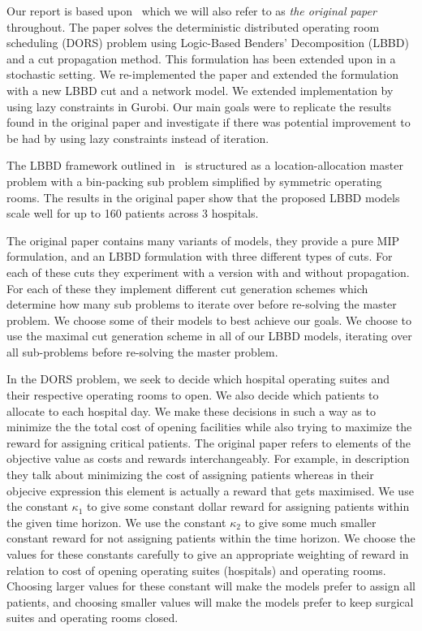 Our report is based upon~\cite{roshanaei2017propagating} which we will also refer to as \textit{the original paper} throughout. The paper solves the deterministic distributed  operating room scheduling (DORS) problem using Logic-Based Benders' Decomposition (LBBD) and a cut propagation method. This formulation has been extended upon in a stochastic setting\cite{guo}. We re-implemented the paper and extended the formulation with a new LBBD cut and a network model. We extended implementation by using lazy constraints in Gurobi. Our main goals were to replicate the results found in the original paper and investigate if there was potential improvement to be had by using lazy constraints instead of iteration.

The LBBD framework outlined in~\cite{roshanaei2017propagating} is structured as a location-allocation master problem with a bin-packing sub problem simplified by symmetric operating rooms. The results in the original paper show that the proposed LBBD models scale well for up to 160 patients across 3 hospitals.

The original paper contains many variants of models, they provide a pure MIP formulation, and an LBBD formulation with three different types of cuts. For each of these cuts they experiment with a version with and without propagation. For each of these they implement different cut generation schemes which determine how many sub problems to iterate over before re-solving the master problem. We choose some of their models to best achieve our goals. We choose to use the maximal cut generation scheme in all of our LBBD models, iterating over all sub-problems before re-solving the master problem.

In the DORS problem, we seek to decide which hospital operating suites and their respective operating rooms to open. We also decide which patients to allocate to each hospital day. We make these decisions in such a way as to minimize the the total cost of opening facilities while also trying to maximize the reward for assigning critical patients\cite{roshanaei2017propagating}. The original paper refers to elements of the objective value as costs and rewards interchangeably. For example, in description they talk about minimizing the cost of assigning patients whereas in their objecive expression this element is actually a reward that gets maximised. We use the constant $\kappa_1$ to give some constant dollar reward for assigning patients within the given time horizon. We use the constant $\kappa_2$ to give some much smaller constant reward for not assigning patients within the time horizon. We choose the values for these constants carefully to give an appropriate weighting of reward in relation to cost of opening operating suites (hospitals) and operating rooms. Choosing larger values for these constant will make the models prefer to assign all patients, and choosing smaller values will make the models prefer to keep surgical suites and operating rooms closed.